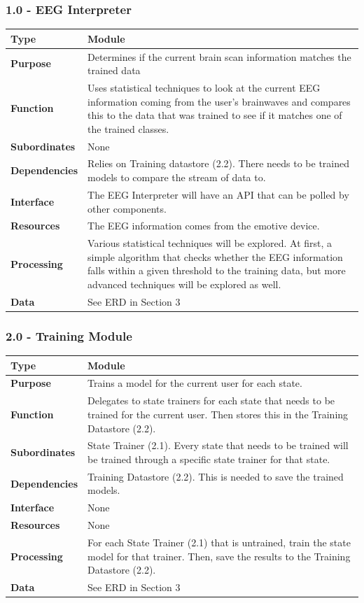 \documentclass{article}
\begin{document}
\subsubsection*{1.0 - EEG Interpreter}
\begin{tabular}{ | l |  p{13.3cm} |}
\hline
\textbf{Type} & Module \\ \hline
\textbf{Purpose} & Determines if the current brain scan information matches the trained data \\ \hline
\textbf{Function} & Uses statistical techniques to look at the current EEG information coming from the user's brainwaves and compares this to the data that was trained to see if it matches one of the trained classes. \\ \hline
\textbf{Subordinates} & None \\ \hline
\textbf{Dependencies} & Relies on Training datastore (2.2). There needs to be trained models to compare the stream of data to. \\ \hline
\textbf{Interface} & The EEG Interpreter will have an API that can be polled by other components. \\ \hline
\textbf{Resources} & The EEG information comes from the emotive device. \\ \hline
\textbf{Processing} & Various statistical techniques will be explored. At first, a simple algorithm that checks whether the EEG information falls within a given threshold to the training data, but more advanced techniques will be explored as well. \\ \hline
\textbf{Data} & See ERD in Section 3 \\ \hline
\end{tabular}

\subsubsection*{2.0 - Training Module}
\begin{tabular}{ | l |  p{13.3cm} |}
\hline
\textbf{Type} & Module \\ \hline
\textbf{Purpose} & Trains a model for the current user for each state. \\ \hline
\textbf{Function} & Delegates to state trainers for each state that needs to be trained for the current user. Then stores this in the Training Datastore (2.2). \\ \hline
\textbf{Subordinates} & State Trainer (2.1). Every state that needs to be trained will be trained through a specific state trainer for that state. \\ \hline
\textbf{Dependencies} & Training Datastore (2.2). This is needed to save the trained models. \\ \hline
\textbf{Interface} & None \\ \hline
\textbf{Resources} & None \\ \hline
\textbf{Processing} & For each State Trainer (2.1) that is untrained, train the state model for that trainer. Then, save the results to the Training Datastore (2.2). \\ \hline
\textbf{Data} & See ERD in Section 3 \\ \hline
\end{tabular}
\end{document}
